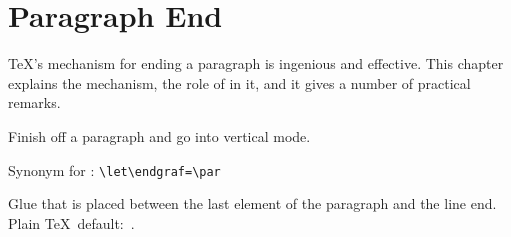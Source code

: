 
\chapter{Paragraph End}\label{par:end}

\TeX's mechanism for ending a paragraph is ingenious and effective.
This chapter explains the mechanism, the role of  in it,
and it gives a number of practical remarks.

\label{cschap:par}\label{cschap:endgraf}\label{cschap:parfillskip}
\begin{inventory}
\item [\cs{par}] 
      Finish off a paragraph and go into vertical mode.

\item [\cs{endgraf}]
      Synonym for : \verb>\let\endgraf=\par>

\item [\cs{parfillskip}] 
      Glue that is placed between the last          
      element of the paragraph and the line end.
      Plain \TeX\ default:~.
\end{inventory}

